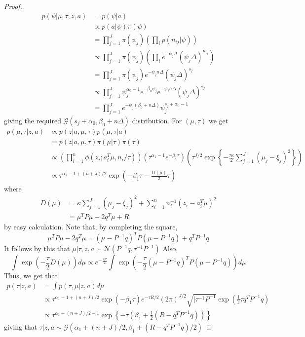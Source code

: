 \documentclass[a4paper,11pt]{article}
\theoremstyle{theorem}
\theoremstyle{definition}
\begin{document}
\begin{proof}
\begin{align*}
p(\psi | \mu, \tau, z, a) &= p(\psi | a) \\
&\propto p(a | \psi)\pi(\psi) \\
&= \prod_{j=1}^{J}{\pi(\psi_j)\left(\prod_{i}{p(n_{ij} | \psi)}\right)} \\
&\propto \prod_{j=1}^{J}{\pi(\psi_j)\left(\prod_{i}{e^{-\psi_j\Delta}(\psi_j\Delta)^{n_{ij}}}\right)} \\
&= \prod_{j=1}^{J}{\pi(\psi_j)e^{-\psi_j n\Delta}(\psi_j\Delta)^{s_{j}}} \\
&\propto \prod_{j=1}^{J}{\psi_{j}^{\alpha_{0} - 1}e^{-\beta_0 \psi_j}e^{-\psi_j n\Delta}(\psi_j\Delta)^{s_{j}}} \\
&= \prod_{j=1}^{J}{e^{-\psi_j(\beta_0 + n\Delta)}\psi_{j}^{s_j + \alpha_0 - 1}}
\end{align*}
giving the required $\mathcal{G}(s_j + \alpha_0, \beta_0 + n \Delta)$ distribution.
For $(\mu, \tau)$ we get
\begin{align*}
p(\mu, \tau | z, a) &\propto p(z |a, \mu, \tau)p(\mu, \tau | a) \\
&= p(z | a, \mu, \tau)\pi(\mu | \tau)\pi(\tau) \\
&\propto \left(\prod_{i=1}^{n}{\phi(z_i; a_{i}^{T} \mu, n_i/\tau)}\right)\left(\tau^{\alpha_1 - 1}e^{-\beta_1 \tau}\right) \left(\tau^{J/2} \exp{\left\lbrace -\frac{\tau\kappa}{2} \sum_{j=1}^{J}{(\mu_j - \xi_j)^2}\right\rbrace}\right) \\
&\propto \tau^{\alpha_1 - 1 + (n + J)/2}\exp{\left(-\beta_1\tau - \frac{D(\mu)}{2}\tau\right)}
\end{align*}
where
\begin{align*}
D(\mu) &= \kappa\sum_{j=1}^{J}{(\mu_j - \xi_j)^2} + \sum_{i=1}^{n}{n_{i}^{-1}(z_i - a_{i}^{T} \mu)^2} \\
&= \mu^{T} P \mu - 2 q^T \mu + R
\end{align*}
by easy calculation. Note that, by completing the square,
\[
\mu^{T} P \mu - 2 q^T \mu = (\mu - P^{-1} q)^{T} P (\mu - P^{-1}q) + q^{T} P^{-1} q
\]
It follows by this that $\mu | \tau, z, a \sim  \mathcal{N}(P^{-1} q, \tau^{-1} P^{-1}) $ Also,
\begin{equation}
\int{\exp(-\frac{\tau}{2}D(\mu))d\mu} \propto e^{-\frac{\tau R}{2}}\int{\exp\left(-\frac{\tau}{2}(\mu - P^{-1} q)^{T} P (\mu - P^{-1}q)\right)d\mu}
\end{equation}
Thus, we get that
\begin{align*}
p(\tau | z, a) &= \int{p(\tau, \mu | z, a)d\mu} \\
&\propto \tau^{ \alpha_1 - 1 + (n + J)/2}\exp(-\beta_1 \tau)e^{-\tau R/2}(2\pi)^{J/2}\sqrt{|\tau^{-1}P^{-1}}\exp\left(\frac{1}{2}\tau q^T P^{-1} q \right)  \\
&\propto \tau^{\alpha_1 + (n+J)/2 - 1}\exp{\left\lbrace -\tau\left(\beta_1 + \frac{1}{2}(R - q^T P^{-1} q)\right) \right\rbrace} 
\end{align*}
giving that $\tau | z, a  \sim  \mathcal{G}(\alpha_1 + (n+J)/2, \beta_1 + (R - q^T P^{-1} q)/2)$
\end{proof}
\end{document}
